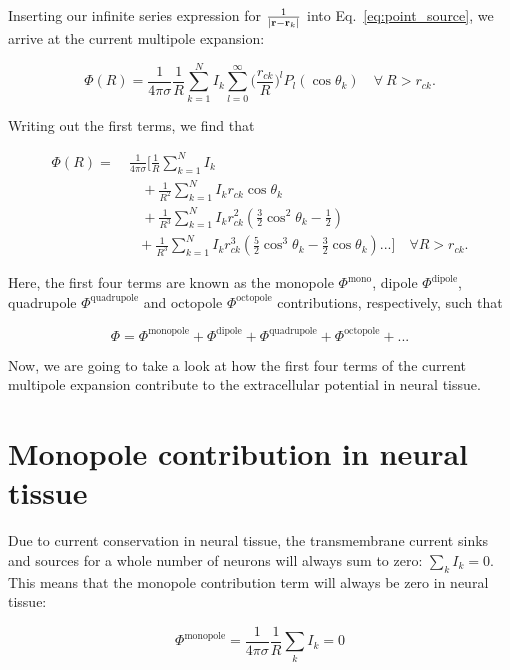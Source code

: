 Inserting our infinite series expression for $\frac{1}{|{\bf r} - {\bf r}_k|}$ into Eq.~\ref{eq:point_source}, we arrive at the current multipole expansion:

\begin{equation}\label{eq:multipole_compact}
\Phi (R) = \frac{1}{4 \pi \sigma}\frac{1}{R} \sum_{k=1}^N I_k \sum_{l = 0}^\infty \big(\frac{r_{ck}}{R}\big)^l P_l(\cos \theta_k) \quad \forall~ R > r_{ck}.
\end{equation}

Writing out the first terms, we find that

\begin{align}\label{eq:multipole}
\Phi(R) =~& 
\frac{1}{4 \pi \sigma} \Bigg[\frac{1}{R} \sum_{k=1}^N I_k \nonumber\\
&~~~~+ \frac{1}{R^2} \sum_{k=1}^N I_k r_{ck} \cos \theta_k \\
&~~~~+  \frac{1}{R^3} \sum_{k=1}^N I_k r_{ck}^2 \left( \frac{3}{2} \cos^2 \theta_k - \frac{1}{2} \right) \nonumber \\
&~~~ +  \frac{1}{R^3} \sum_{k=1}^N I_k r_{ck}^3 \left( \frac{5}{2} \cos^3 \theta_k - \frac{3}{2} \cos \theta_k \right) ... \nonumber \Bigg] \quad \forall R > r_{ck}.
\end{align}

Here, the first four terms are known as the monopole $\Phi^{\mathrm{mono}}$, dipole $\Phi^{\mathrm{dipole}}$, quadrupole $\Phi^{\mathrm{quadrupole}}$ and octopole $\Phi^{\mathrm{octopole}}$ contributions, respectively, such that

\begin{equation}
\Phi = \Phi^{\mathrm{monopole}} + \Phi^{\mathrm{dipole}} + \Phi^{\mathrm{quadrupole}} + \Phi^{\mathrm{octopole}} + ...
\end{equation}

Now, we are going to take a look at how the first four terms of the current multipole expansion contribute to the extracellular potential in neural tissue.

\section{Monopole contribution in neural tissue}\label{subsec:mono}
Due to current conservation in neural tissue, the transmembrane current sinks and sources for a whole number of neurons will always sum to zero: $\sum_k I_k = 0$. This means that the monopole contribution term will always be zero in neural tissue:

\begin{equation*}
\Phi^{\mathrm{monopole}} = \frac{1}{4 \pi \sigma} \frac{1}{R} \sum_k I_k = 0
\end{equation*}

